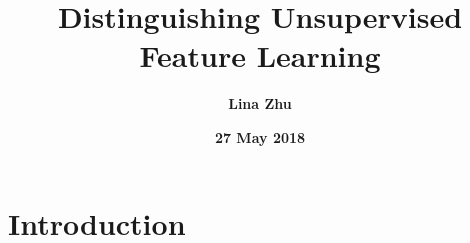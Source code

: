 \documentclass[a4paper,12pt]{article}
\begin{document}
%
 \title{\textbf{\bfseries \LARGE Distinguishing Unsupervised Feature Learning} }
\author{\textbf{Lina Zhu}}
\date{\textbf{27 May 2018}}
\maketitle	
\section{Introduction}
\end{document}
